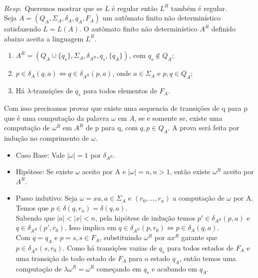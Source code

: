 \documentclass{homework}
\begin{document}
\pagestyle{fancy}

\\

	$Resp:$ Queremos mostrar que se $L$ é regular então $L^R$ também é regular.\\
	Seja $A = (Q_A,\Sigma_A,\delta_A,q_A,F_A)$ um autômato finito não determinístico satisfazendo $L = L(A)$. O autômato finito não determinístico $A^R$ definido abaixo aceita a linguagem $L^R$.
	\begin{enumerate}
		\item $A^R = (Q_A \cup \{q_s\},\Sigma_A,\delta_{A^R},q_s,\{q_A\})$, com $q_s \notin Q_A$;
		\item $p \in \delta_A(q,a) \iff q \in \delta_{A^R}(p,a)$, onde $a \in \Sigma_A$ e $p,q \in Q_A$;
		\item Há $\lambda$-transições de $q_s$ para todos elementos de $F_A$.
	\end{enumerate}
	Com isso precisamos provar que existe uma sequencia de transições de q para p que é uma computação da palavra $\omega$ em $A$, se e somente se, existe uma computação de $\omega^R$ em $A^R$ de p para q, com $q,p \in Q_A$. A prova será feita por indução no comprimento de $\omega$.
	\begin{itemize}
		\item Caso Base: Vale $|\omega|=1$ por $\delta_{A^R}$.
		\item Hipótese: Se existe $\omega$ aceito por A e $|\omega|=n,n > 1$, então existe $\omega^R$ aceito por $A^R$.
		\item Passo indutivo: Seja $\omega = xa, a \in \Sigma_A$ e $(r_0,...,r_n)$ a computação de $\omega$ por A. Temos que $p \in \delta(q, r_{n}) = \delta(q, a)$.\\
		Sabendo que $|a| < |x| < n$, pela hipótese de indução temos $p' \in \delta_{A^R}(p,a)$ e $q \in \delta_{A^R}(p', r_0)$. Isso implica em $q \in \delta_{A^R}(p,r_0) \iff p \in \delta_A(q,a)$.\\
		Com $q = q_A$ e $p = s, s \in F_A$, substituindo $\omega^R$ por $ax^R$ garante que $p \in \delta_{A^R}(s, r_0)$. Como há transições vazias de $q_s$ para todos estados de $F_A$ e uma transição de todo estado de $F_A$ para o estado $q_A$, então temos uma computação de $\lambda \omega^R = \omega^R$ começando em $q_s$ e acabando em $q_A$.				
	\end{itemize}
\end{document}
